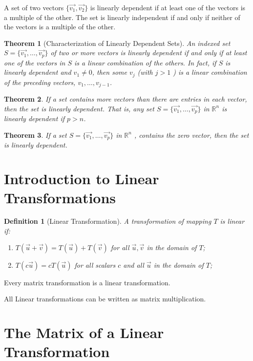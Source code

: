 \documentclass[oneside]{report}
\newtheorem{theorem}{Theorem}[section]
\newtheorem{definition}{Definition}[section]
\begin{document}
A set of two vectors $\{\vec{v_1},\vec{v_2}\}$ is linearly dependent if at least one of the vectors is a multiple of the other. The set is linearly independent if and only if neither of the
vectors is a multiple of the other.

\begin{theorem}[Characterization of Linearly Dependent Sets]
  An indexed set $S = \{\vec{v_1}, \dots , \vec{v_p}\}$ of two or more vectors is linearly dependent if and only if at least one of the vectors in $S$ is a linear combination of the others. In
  fact, if $S$ is linearly dependent and $v_1 \neq 0$, then some $v_j$ (with $j > 1$ ) is a linear
  combination of the preceding vectors, $v_1, \dots, v_{j-1}$.
\end{theorem}

\begin{theorem}
  If a set contains more vectors than there are entries in each vector, then the set
is linearly dependent. That is, any set $S = \{\vec{v_1}, \dots , \vec{v_p}\}$ in $\mathbb{R}^n$ is linearly dependent if $p > n$.
\end{theorem}

\begin{theorem}
  If a set $S = \{\vec{v_1}, \dots , \vec{v_p}\}$ in $\mathbb{R}^n$ , contains the zero vector, then the set is linearly dependent.
\end{theorem}

\section{Introduction to Linear Transformations}

\begin{definition}[Linear Transformation]
  A transformation of mapping $T$ is linear if:
  \begin{enumerate}
    \item $T(\vec{u} + \vec{v}) = T(\vec{u}) + T(\vec{v})$ for all $\vec{u}, \vec{v}$ in the domain of $T$;
    \item $T(c\vec{u}) = cT(\vec{u})$ for all scalars $c$ and all $\vec{u}$ in the domain of $T$;
  \end{enumerate}
\end{definition}

Every matrix transformation is a linear transformation.

All Linear transformations can be written as matrix multiplication.

\section{The Matrix of a Linear Transformation}
\end{document}
